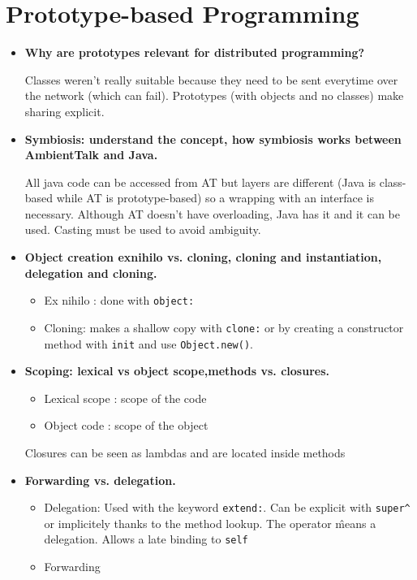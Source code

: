 \documentclass[a4paper]{report}
\begin{document}
\chapter{Prototype-based Programming}
\begin{itemize}
  \item \textbf{Why are prototypes relevant for distributed programming?}

  Classes weren't really suitable because they need to be sent everytime over the network (which can fail). Prototypes (with objects and no classes) make sharing explicit.
  \item \textbf{Symbiosis: understand the concept, how symbiosis works between AmbientTalk and Java.}

  All java code can be accessed from AT but layers are different (Java is class-based while AT is prototype-based) so a wrapping with an interface is necessary.
  Although AT doesn't have overloading, Java has it and it can be used. Casting must be used to avoid ambiguity.
  \item \textbf{Object creation exnihilo vs. cloning, cloning and instantiation, delegation and cloning.}

  \begin{itemize}
    \item Ex nihilo : done with \texttt{object:{}}
    \item Cloning: makes a shallow copy with \texttt{clone:} or by creating a constructor method with \texttt{init} and use \texttt{Object.new()}.
  \end{itemize}
  \item \textbf{Scoping: lexical vs object scope,methods vs. closures.}

  \begin{itemize}
    \item Lexical scope : scope of the code
    \item Object code : scope of the object
  \end{itemize}
  Closures can be seen as lambdas and are located inside methods

  \item \textbf{Forwarding vs. delegation.}

    \begin{itemize}
      \item Delegation: Used with the keyword \texttt{extend:}. Can be explicit with \texttt{super\^} or implicitely thanks to the method lookup. The operator \^ means  a delegation. Allows a late binding to \texttt{self}
      \item Forwarding
    \end{itemize}


\end{itemize}
\end{document}

